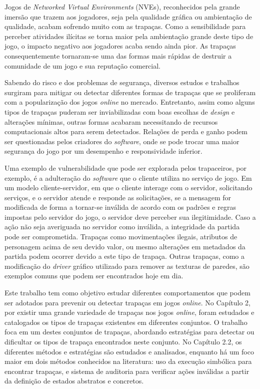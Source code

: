 Jogos de \textit{Networked Virtual Environments} (NVEs), reconhecidos pela grande imersão que trazem aos jogadores, seja pela qualidade gráfica ou ambientação de qualidade, acabam sofrendo muito com as trapaças. Como a sensibilidade para perceber atividades ilícitas se torna maior pela ambientação grande deste tipo de jogo, o impacto negativo aos jogadores acaba sendo ainda pior. As trapaças consequentemente tornaram-se uma das formas mais rápidas de destruir a comunidade de um jogo e sua reputação comercial.  

Sabendo do risco e dos problemas de segurança, diversos estudos e trabalhos surgiram para mitigar ou detectar diferentes formas de trapaças que se proliferam com a popularização dos jogos \textit{online} no mercado. Entretanto, assim como alguns tipos de trapaças puderam ser inviabilizadas com boas escolhas de \textit{design} e alterações mínimas, outras formas acabaram necessitando de recursos computacionais altos para serem detectados. Relações de perda e ganho podem ser questionadas pelos criadores do \textit{software}, onde se pode trocar uma maior segurança do jogo por um desempenho e responsividade inferior.


Uma exemplo de vulnerabilidade que pode ser explorada pelos trapaceiros, por exemplo, é a adulteração do \textit{software} que o cliente utiliza no serviço de jogo. Em um modelo cliente-servidor, em que o cliente interage com o servidor, solicitando serviços, e o servidor atende e responde as solicitações, se a mensagem for modificada de forma a tornar-se inválida de acordo com os padrões e regras impostas pelo servidor do jogo, o servidor deve perceber sua ilegitimidade. Caso a ação não seja averiguada no servidor como  inválida, a integridade da partida pode ser comprometida. Trapaças como movimentações ilegais, atributos de personagem acima de seu devido valor, ou mesmo alterações em metadados da partida podem ocorrer devido a este tipo de trapaça. Outras trapaças, como a modificação do \textit{driver} gráfico utilizado para remover as texturas de paredes, são exemplos comuns que podem ser encontrados hoje em dia.


Este trabalho tem como objetivo estudar diferentes comportamentos que podem ser adotados para prevenir ou detectar trapaças em jogos \textit{online}. No Capítulo 2, por existir uma grande variedade de trapaças nos jogos \textit{online}, foram estudados e catalogados os tipos de trapaças existentes em diferentes conjuntos. O trabalho foca em um destes conjuntos de trapaças, abordando estratégias para detectar ou dificultar os tipos de trapaça encontrados neste conjunto. No Capítulo 2.2, os diferentes métodos e estratégias são estudados e analisados, enquanto há um foco maior em dois métodos conhecidos na literatura: uso da execução simbólica para encontrar trapaças, e sistema de auditoria para verificar ações inválidas a partir da definição de estados abstratos e concretos.


